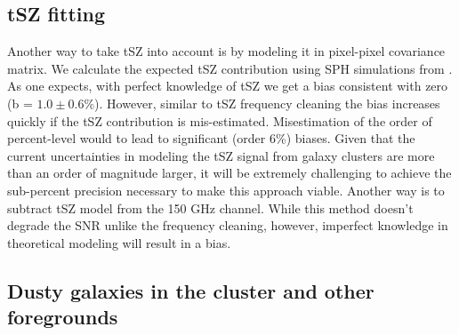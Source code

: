  \subsection{tSZ fitting}
 Another way to take tSZ into account is by modeling it in pixel-pixel covariance matrix.
 We calculate the expected tSZ contribution using SPH simulations from \citet{mccarthy2013}.
As one expects, with perfect knowledge of tSZ we get a bias consistent with zero (b = $1.0 \pm 0.6\%$).
However, similar to tSZ frequency cleaning the bias increases quickly if the tSZ contribution is mis-estimated.
Misestimation of the order of percent-level would to lead to significant (order 6\%) biases.
Given that the current uncertainties in modeling the tSZ signal from galaxy clusters are more than an order of magnitude larger, it will be extremely challenging to achieve the sub-percent precision necessary to make this approach viable.
Another way is to subtract tSZ model from the 150 GHz channel.
 While this method doesn't degrade the SNR unlike the frequency cleaning, however, imperfect knowledge in theoretical modeling will result in a bias.
 
 
 
 \subsection{Dusty galaxies in the cluster and other foregrounds}
\label{sec_DG_sys_bias}


